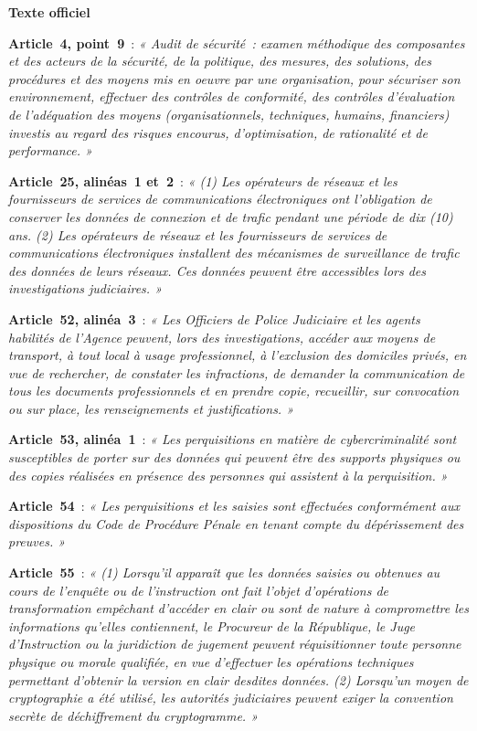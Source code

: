 \begin{boxjuris}
\textbf{Texte officiel}~\cite{cameroun2010a}

\medskip
\textbf{Article~4, point~9}~: \textit{« Audit de sécurité~: examen
méthodique des composantes et des acteurs de la sécurité, de la politique,
des mesures, des solutions, des procédures et des moyens mis en oeuvre par
une organisation, pour sécuriser son environnement, effectuer des contrôles
de conformité, des contrôles d'évaluation de l'adéquation des moyens
(organisationnels, techniques, humains, financiers) investis au regard des
risques encourus, d'optimisation, de rationalité et de performance. »}

\medskip
\textbf{Article~25, alinéas~1 et~2}~: \textit{« (1) Les opérateurs de réseaux et les fournisseurs de services de communications électroniques ont l'obligation de conserver les données de connexion et de trafic pendant une période de dix (10) ans. (2) Les opérateurs de réseaux et les fournisseurs de services de communications électroniques installent des mécanismes de surveillance de trafic des données de leurs réseaux. Ces données peuvent être accessibles lors des investigations judiciaires. »}

\medskip
\textbf{Article~52, alinéa~3}~: \textit{« Les Officiers de Police Judiciaire
et les agents habilités de l'Agence peuvent, lors des investigations,
accéder aux moyens de transport, à tout local à usage professionnel, à
l'exclusion des domiciles privés, en vue de rechercher, de constater les
infractions, de demander la communication de tous les documents
professionnels et en prendre copie, recueillir, sur convocation ou sur
place, les renseignements et justifications. »}

\medskip
\textbf{Article~53, alinéa~1}~: \textit{« Les perquisitions en matière de
cybercriminalité sont susceptibles de porter sur des données qui peuvent
être des supports physiques ou des copies réalisées en présence des
personnes qui assistent à la perquisition. »}

\medskip
\textbf{Article~54}~: \textit{« Les perquisitions et les saisies sont effectuées conformément aux dispositions du Code de Procédure Pénale en tenant compte du dépérissement des preuves. »}

\medskip
\textbf{Article~55}~: \textit{« (1) Lorsqu'il apparaît que les données saisies ou obtenues au cours de l'enquête ou de l'instruction ont fait l'objet d'opérations de transformation empêchant d'accéder en clair ou sont de nature à compromettre les informations qu'elles contiennent, le Procureur de la République, le Juge d'Instruction ou la juridiction de jugement peuvent réquisitionner toute personne physique ou morale qualifiée, en vue d'effectuer les opérations techniques permettant d'obtenir la version en clair desdites données. (2) Lorsqu'un moyen de cryptographie a été utilisé, les autorités judiciaires peuvent exiger la convention secrète de déchiffrement du cryptogramme. »}


\end{boxjuris}
